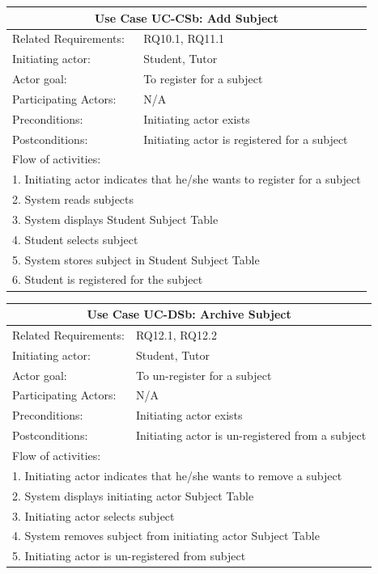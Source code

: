 \documentclass[12pt]{article}
\begin{document}
{		\begin{tabular}{| l | p{10cm}| }
			\hline\multicolumn{2}{|c|}{ \textbf{Use Case UC-CSb: Add Subject}} \\ \hline
			Related Requirements: & RQ10.1, RQ11.1  \\ \hline
			Initiating actor: & Student, Tutor \\ \hline
			Actor goal: & To register for a subject\\ \hline
			Participating Actors: &N/A\\ \hline
			Preconditions: &Initiating actor exists\\ \hline
			Postconditions: & Initiating actor is registered for a subject\\ \hline
			\multicolumn{2}{|l|}{Flow of activities:}\\ \hline
			\multicolumn{2}{|p{15cm}|}{1. Initiating actor indicates that he/she wants to register for a subject}\\
			\multicolumn{2}{|p{15cm}|}{2. System reads subjects}\\
			\multicolumn{2}{|p{15cm}|}{3. System displays Student Subject Table}\\
			\multicolumn{2}{|l|}{4. Student selects subject}\\
			\multicolumn{2}{|l|}{5. System stores subject in Student Subject Table}\\
			\multicolumn{2}{|l|}{6. Student is registered for the subject}\\
			 \hline
		\end{tabular}

		\begin{tabular}{| l | p{10cm}| }
			\hline\multicolumn{2}{|c|}{ \textbf{Use Case UC-DSb: Archive Subject} }\\ \hline
			Related Requirements: & RQ12.1, RQ12.2  \\ \hline
			Initiating actor: & Student, Tutor \\ \hline
			Actor goal: & To un-register for a subject\\ \hline
			Participating Actors: &N/A\\ \hline
			Preconditions: &Initiating actor exists\\ \hline
			Postconditions: & Initiating actor is un-registered from a subject\\ \hline
			\multicolumn{2}{|l|}{Flow of activities:}\\ \hline
			\multicolumn{2}{|p{15cm}|}{1. Initiating actor indicates that he/she wants to remove a subject}\\
			\multicolumn{2}{|p{15cm}|}{2. System displays initiating actor Subject Table}\\
			\multicolumn{2}{|l|}{3. Initiating actor selects subject}\\
			\multicolumn{2}{|l|}{4. System removes subject from initiating actor Subject Table}\\
			\multicolumn{2}{|l|}{5. Initiating actor is un-registered from subject}\\
			 \hline
		\end{tabular}

}
\end{document}
